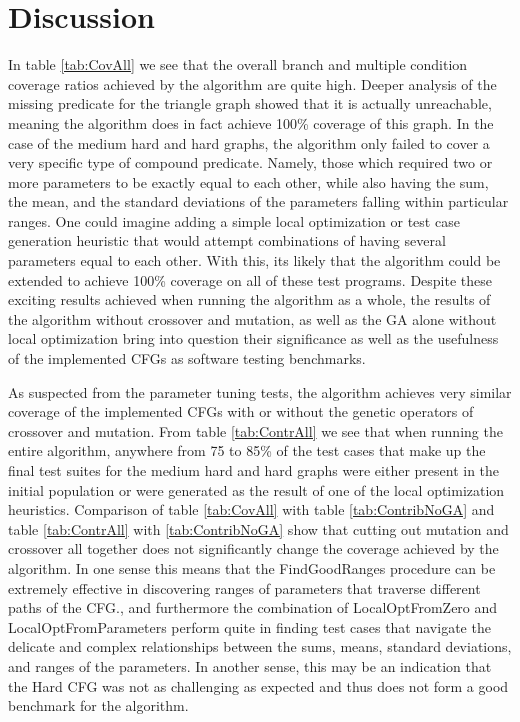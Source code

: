 \documentclass[runningheads]{llncs}
\begin{document}
\FloatBarrier
\newpage
\section{Discussion}
In table \ref{tab:CovAll} we see that the overall branch and multiple condition coverage ratios achieved by the algorithm are quite high. Deeper analysis of the missing predicate for the triangle graph showed that it is actually unreachable, meaning the algorithm does in fact achieve 100\% coverage of this graph. In the case of the medium hard and hard graphs, the algorithm only failed to cover a very specific type of compound predicate. Namely, those which required two or more parameters to be exactly equal to each other, while also having the sum, the mean, and the standard deviations of the parameters falling within particular ranges. One could imagine adding a simple local optimization or test case generation heuristic that would attempt combinations of having several parameters equal to each other. With this, its likely that the algorithm could be extended to achieve 100\% coverage on all of these test programs. Despite these exciting results achieved when running the algorithm as a whole, the results of the algorithm without crossover and mutation, as well as the GA alone without local optimization bring into question their significance as well as the usefulness of the implemented CFGs as software testing benchmarks.

As suspected from the parameter tuning tests, the algorithm achieves very similar coverage of the implemented CFGs with or without the genetic operators of crossover and mutation. From table \ref{tab:ContrAll} we see that when running the entire algorithm, anywhere from 75 to 85\% of the test cases that make up the final test suites for the medium hard and hard graphs were either present in the initial population or were generated as the result of one of the local optimization heuristics. Comparison of table \ref{tab:CovAll} with table \ref{tab:ContribNoGA} and table \ref{tab:ContrAll} with \ref{tab:ContribNoGA} show that cutting out mutation and crossover all together does not significantly change the coverage achieved by the algorithm. In one sense this means that the FindGoodRanges procedure can be extremely effective in discovering ranges of parameters that traverse different paths of the CFG., and furthermore the combination of LocalOptFromZero and LocalOptFromParameters perform quite in finding test cases that navigate the delicate and complex relationships between the sums, means, standard deviations, and ranges of the parameters. In another sense, this may be an indication that the Hard CFG was not as challenging as expected and thus does not form a good benchmark for the algorithm.
\end{document}
